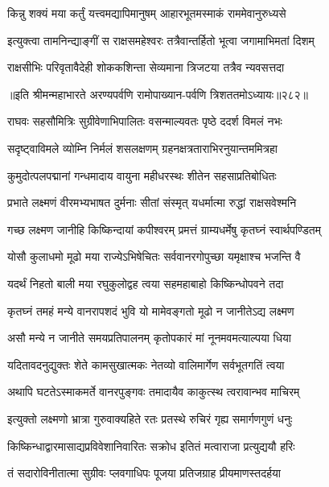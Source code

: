 \twolineshloka
{किन्नु शक्यं मया कर्तुं यत्त्वमद्यापिमानुषम्}
{आहारभूतमस्माकं राममेवानुरुध्यसे}


\twolineshloka
{इत्युक्त्वा तामनिन्द्याङ्गीं स राक्षसमहेश्वरः}
{तत्रैवान्तर्हितो भूत्वा जगामाभिमतां दिशम्}


\twolineshloka
{राक्षसीभिः परिवृतावैदेही शोककशिन्ता}
{सेव्यमाना त्रिजटया तत्रैव न्यवसत्तदा}


॥इति श्रीमन्महाभारते अरण्यपर्वणि रामोपाख्यान-पर्वणि त्रिशततमोऽध्यायः॥२८२॥

\storymeta

\resetShloka



\twolineshloka
{राघवः सहसौमित्रिः सुग्रीवेणाभिपालितः}
{वसन्माल्यवतः पृष्ठे ददर्श विमलं नभः}


\twolineshloka
{सदृष्ट्वाविमले व्योम्नि निर्मलं शसलक्षणम्}
{ग्रहनक्षत्रताराभिरनुयान्तममित्रहा}


\twolineshloka
{कुमुदोत्पलपद्मानां गन्धमादाय वायुना}
{महीधरस्थः शीतेन सहसाप्रतिबोधितः}


\twolineshloka
{प्रभाते लक्ष्मणं वीरमभ्यभाषत दुर्मनाः}
{सीतां संस्मृत् यधर्मात्मा रुद्धां राक्षसवेश्मनि}


\twolineshloka
{गच्छ लक्ष्मण जानीहि किष्किन्दायां कपीश्वरम्}
{प्रमत्तं ग्राम्यधर्मेषु कृतघ्नं स्वार्थपण्डितम्}


\twolineshloka
{योसौ कुलाधमो मूढो मया राज्येऽभिषेचितः}
{सर्ववानरगोपुच्छा यमृक्षाश्च भजन्ति वै}


\twolineshloka
{यदर्थं निहतो बाली मया रघुकुलोद्वह}
{त्वया सहमहाबाहो किष्किन्धोपवने तदा}


\twolineshloka
{कृतघ्नं तमहं मन्ये वानरापशदं भुवि}
{यो मामेवङ्गतो मूढो न जानीतेऽद्य लक्ष्मण}


\twolineshloka
{असौ मन्ये न जानीते समयप्रतिपालनम्}
{कृतोपकारं मां नूनमवमत्याल्पया धिया}


\twolineshloka
{यदितावदनुद्युक्तः शेते कामसुखात्मकः}
{नेतव्यो वालिमार्गेण सर्वभूतगतिं त्वया}


\twolineshloka
{अथापि घटतेऽस्माकमर्ते वानरपुङ्गवः}
{तमादायैव काकुत्स्थ त्वरावान्भव माचिरम्}


\twolineshloka
{इत्युक्तो लक्ष्मणो भ्रात्रा गुरुवाक्यहिते रतः}
{प्रतस्थे रुचिरं गृह्य समार्गणगुणं धनुः}


\twolineshloka
{किष्किन्धाद्वारमासाद्यप्रविवेशानिवारितः}
{सक्रोध इतितं मत्वाराजा प्रत्युद्ययौ हरिः}


\twolineshloka
{तं सदारोविनीतात्मा सुग्रीवः प्लवगाधिपः}
{पूजया प्रतिजग्राह प्रीयमाणस्तदर्हया}


